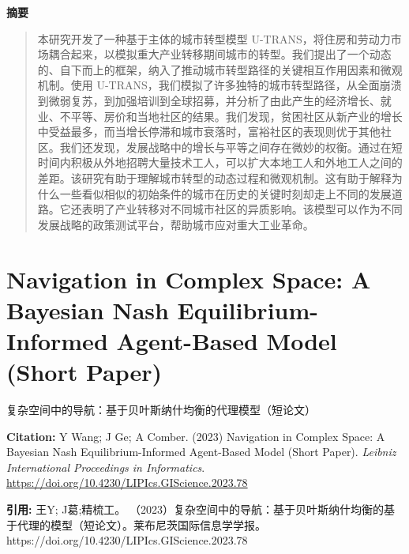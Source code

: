 \noindent\textbf{摘要}\par
\begin{quote}\small
本研究开发了一种基于主体的城市转型模型 U-TRANS，将住房和劳动力市场耦合起来，以模拟重大产业转移期间城市的转型。我们提出了一个动态的、自下而上的框架，纳入了推动城市转型路径的关键相互作用因素和微观机制。使用 U-TRANS，我们模拟了许多独特的城市转型路径，从全面崩溃到微弱复苏，到加强培训到全球招募，并分析了由此产生的经济增长、就业、不平等、房价和当地社区的结果。我们发现，贫困社区从新产业的增长中受益最多，而当增长停滞和城市衰落时，富裕社区的表现则优于其他社区。我们还发现，发展战略中的增长与平等之间存在微妙的权衡。通过在短时间内积极从外地招聘大量技术工人，可以扩大本地工人和外地工人之间的差距。该研究有助于理解城市转型的动态过程和微观机制。这有助于解释为什么一些看似相似的初始条件的城市在历史的关键时刻却走上不同的发展道路。它还表明了产业转移对不同城市社区的异质影响。该模型可以作为不同发展战略的政策测试平台，帮助城市应对重大工业革命。
\end{quote}

\vspace{0.5em}
\chapter{Navigation in Complex Space: A Bayesian Nash Equilibrium-Informed Agent-Based Model (Short Paper)}
\begin{center}\small 复杂空间中的导航：基于贝叶斯纳什均衡的代理模型（短论文）\end{center}

\noindent\textbf{Citation:} Y Wang; J Ge; A Comber. (2023) Navigation in Complex Space: A Bayesian Nash Equilibrium-Informed Agent-Based Model (Short Paper). \textit{Leibniz International Proceedings in Informatics}. \url{https://doi.org/10.4230/LIPIcs.GIScience.2023.78}

\vspace{0.5em}
\noindent\textbf{引用:} 王Y; J葛;精梳工。 （2023）复杂空间中的导航：基于贝叶斯纳什均衡的基于代理的模型（短论文）。莱布尼茨国际信息学学报。 https://doi.org/10.4230/LIPIcs.GIScience.2023.78

